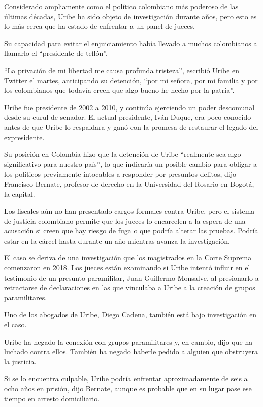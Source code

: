 Considerado ampliamente como el político colombiano más poderoso de las
últimas décadas, Uribe ha sido objeto de investigación durante años,
pero esto es lo más cerca que ha estado de enfrentar a un panel de
jueces.

Su capacidad para evitar el enjuiciamiento había llevado a muchos
colombianos a llamarlo el ``presidente de teflón''.

``La privación de mi libertad me causa profunda tristeza'',
\href{https://twitter.com/AlvaroUribeVel/status/1290712262504779784}{escribió}
Uribe en Twitter el martes, anticipando su detención, ``por mi señora,
por mi familia y por los colombianos que todavía creen que algo bueno he
hecho por la patria''.

Uribe fue presidente de 2002 a 2010, y continúa ejerciendo un poder
descomunal desde su curul de senador. El actual presidente, Iván Duque,
era poco conocido antes de que Uribe lo respaldara y ganó con la promesa
de restaurar el legado del expresidente.

Su posición en Colombia hizo que la detención de Uribe ``realmente sea
algo significativo para nuestro país'', lo que indicaría un posible
cambio para obligar a los políticos previamente intocables a responder
por presuntos delitos, dijo Francisco Bernate, profesor de derecho en la
Universidad del Rosario en Bogotá, la capital.

Los fiscales aún no han presentado cargos formales contra Uribe, pero el
sistema de justicia colombiano permite que los jueces lo encarcelen a la
espera de una acusación si creen que hay riesgo de fuga o que podría
alterar las pruebas. Podría estar en la cárcel hasta durante un año
mientras avanza la investigación.

El caso se deriva de una investigación que los magistrados en la Corte
Suprema comenzaron en 2018. Los jueces están examinando si Uribe intentó
influir en el testimonio de un presunto paramilitar, Juan Guillermo
Monsalve, al presionarlo a retractarse de declaraciones en las que
vinculaba a Uribe a la creación de grupos paramilitares.

Uno de los abogados de Uribe, Diego Cadena, también está bajo
investigación en el caso.

Uribe ha negado la conexión con grupos paramilitares y, en cambio, dijo
que ha luchado contra ellos. También ha negado haberle pedido a alguien
que obstruyera la justicia.

Si se lo encuentra culpable, Uribe podría enfrentar aproximadamente de
seis a ocho años en prisión, dijo Bernate, aunque es probable que en su
lugar pase ese tiempo en arresto domiciliario.


